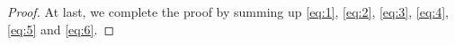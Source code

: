 \documentclass[reqno, 12pt]{amsart} %
\theoremstyle{plain} %
\theoremstyle{definition}
\theoremstyle{remark}
\numberwithin{equation}{section} %
\newcommand{\lt}{\left}
\newcommand{\rt}{\right}
\newcommand{\px}{\partial_x}
\begin{document}
\begin{proof}
		At last, we complete the proof by summing up \eqref{eq:1}, \eqref{eq:2}, \eqref{eq:3}, \eqref{eq:4}, \eqref{eq:5} and \eqref{eq:6}.
	\end{proof}
	
\end{document}
